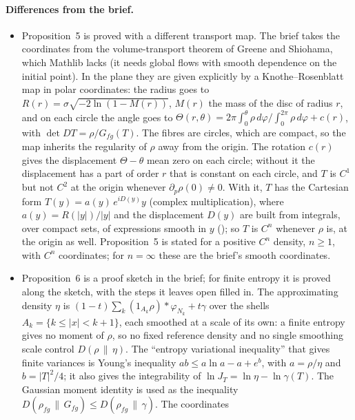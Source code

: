 \documentclass[11pt]{article}
\begin{document}
\paragraph{Differences from the brief.}
\begin{itemize}
\item Proposition~5 is proved with a different transport map. The brief takes the coordinates
  from the volume-transport theorem of Greene and Shiohama, which Mathlib lacks (it needs global
  flows with smooth dependence on the initial point). In the plane they are given explicitly by
  a Knothe--Rosenblatt map in polar coordinates: the radius goes to $R(r) =
  \sigma\sqrt{-2\ln(1 - M(r))}$, $M(r)$ the mass of the disc of radius $r$, and on each circle
  the angle goes to $\Theta(r, \theta) = 2\pi\int_0^\theta\rho\,d\varphi / \int_0^{2\pi}\rho\,
  d\varphi + c(r)$, with $\det DT = \rho/G_{fg}(T)$. The fibres are circles, which are compact,
  so the map inherits the regularity of $\rho$ away from the origin. The rotation $c(r)$ gives
  the displacement $\Theta - \theta$ mean zero on each circle; without it the displacement has a
  part of order $r$ that is constant on each circle, and $T$ is $C^1$ but not $C^2$ at the origin
  whenever $\partial_p\rho(0) \ne 0$. With it, $T$ has the Cartesian form $T(y) = a(y)\,
  e^{iD(y)}y$ (complex multiplication), where $a(y) = R(|y|)/|y|$ and the displacement $D(y)$ are
  built from integrals, over compact sets, of expressions smooth in $y$
  (); so $T$ is $C^n$ whenever $\rho$ is,
  at the origin as well. Proposition~5 is stated for a positive $C^n$ density, $n \ge 1$, with
  $C^n$ coordinates; for $n = \infty$ these are the brief's smooth coordinates.
\item Proposition~6 is a proof sketch in the brief; for finite entropy it is proved along the
  sketch, with the steps it leaves open filled in. The approximating density $\eta$ is
  $(1 - t)\sum_k (1_{A_k}\rho) * \varphi_{N_k} + t\gamma$ over the shells
  $A_k = \{k \le |x| < k + 1\}$, each smoothed at a scale of its own: a finite entropy gives no
  moment of $\rho$, so no fixed reference density and no single smoothing scale control
  $D(\rho\,\|\,\eta)$. The ``entropy variational inequality'' that gives finite variances is
  Young's inequality $ab \le a\ln a - a + e^b$, with $a = \rho/\eta$ and $b = |T|^2/4$; it also
  gives the integrability of $\ln J_T = \ln\eta - \ln\gamma(T)$. The Gaussian moment identity is
  used as the inequality $D(\rho_{fg}\,\|\,G_{fg}) \le D(\rho_{fg}\,\|\,\gamma)$. The coordinates

\end{itemize}
\end{document}
